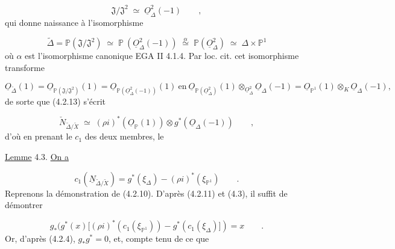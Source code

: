 \begin{equation*}
\mathfrak{J}/\mathfrak{J}^2 \;\simeq\; \underline{O}^2_\Delta(-1) \qquad ,
\end{equation*}
qui donne naissance à l'isomorphisme

\begin{equation*}
\widetilde{\Delta} = \mathbb{P}(\mathfrak{J}/\mathfrak{J}^2) \;\simeq\; \mathbb{P} \ (\underline{O}^2_\Delta(-1)) \;\stackrel{\alpha}{\simeq}\; \mathbb{P}(\underline{O}^2_\Delta) \;\simeq\; \Delta \times \mathbb{P}^1
\end{equation*}
où $\alpha$ est l'isomorphisme canonique EGA II 4.1.4. Par loc. cit. cet isomorphisme transforme

\begin{equation*}
\underline{O}_{\widetilde{\Delta}}(1) = \underline{O}_{\mathbb{P}(\mathfrak{J}/\mathfrak{J}^2)}(1) = \underline{O}_{\mathbb{P}(\underline{O}^2_\Delta(-1))}(1) \ \text{en} \ \underline{O}_{\mathbb{P}(\underline{O}^2_\Delta)}(1) \otimes_{\underline{O}^2_\Delta} \underline{O}_\Delta(-1) = \underline{O}_{\mathbb{P}^1}(1) \otimes_K \underline{O}_\Delta(-1),
\end{equation*}
de sorte que (4.2.13) s'écrit

\begin{equation}\tag{4.2.14}
\check{N}_{\widetilde{\Delta}/\widetilde{X}} \;\simeq\; (\rho i)^*(\underline{O}_{\mathbb{P}}(1)) \otimes g^*(\underline{O}_\Delta(-1)) \qquad ,
\end{equation}
d'où en prenant le $c_1$ des deux membres, le 



\underline{Lemme} 4.3. \underline{On a}

\begin{equation*}
c_1(\underline{N}_{\widetilde{\Delta}/\widetilde{X}}) = g^*(\xi_\Delta) - (\rho i)^*(\xi_{\mathbb{P}^1}) \qquad .
\end{equation*}
Reprenons la démonstration de (4.2.10). D'après (4.2.11) et (4.3), il suffit de démontrer

\begin{equation*}
g_*(g^*(x)[(\rho i)^* (c_1(\xi_{\mathbb{P}^1})) - g^*(c_1(\xi_\Delta)]) = x \qquad .
\end{equation*}
Or, d'après (4.2.4), $g_*g^* = 0$, et, compte tenu de ce que

